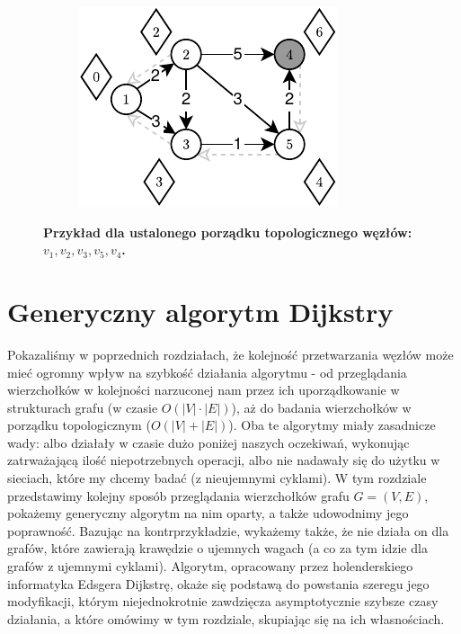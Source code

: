 \begin{figure}[!htbp]
\begin{subfigure}[b]{0.18\textwidth}
		\includegraphics[width=\textwidth]{Chapter_II/TOPOLOGIC-SHORTEST-PATH-Example/e.pdf}
		\caption{}
	\end{subfigure}
	\caption{\textbf{Przykład dla ustalonego porządku topologicznego węzłów: $v_{1}, v_{2}, v_{3}, v_{5}, v_{4}$.}} \label{fig:exampleTopologicalShotrestPath}
\end{figure}

\newpage
\section{Generyczny algorytm Dijkstry}
\label{sec:dijkstraGenericAlgorithm}

Pokazaliśmy w poprzednich rozdziałach, że kolejność przetwarzania węzłów może mieć ogromny wpływ na szybkość działania algorytmu - od przeglądania wierzchołków w kolejności narzuconej nam przez ich uporządkowanie w strukturach grafu (w czasie $ O \left( \left| V \right| \cdot \left| E \right| \right)$), aż do badania wierzchołków w porządku topologicznym ($ O \left( \left| V \right| + \left| E \right| \right)$). Oba te algorytmy miały zasadnicze wady: albo działały w czasie dużo poniżej naszych oczekiwań, wykonując zatrważającą ilość niepotrzebnych operacji, albo nie nadawały się do użytku w sieciach, które my chcemy badać (z nieujemnymi cyklami). W tym rozdziale przedstawimy kolejny sposób przeglądania wierzchołków grafu $G = \left( V, E \right)$, pokażemy generyczny algorytm na nim oparty, a także udowodnimy jego poprawność. Bazując na kontrprzykładzie, wykażemy także, że nie działa on dla grafów, które zawierają krawędzie o ujemnych wagach (a co za tym idzie dla grafów z ujemnymi cyklami). Algorytm, opracowany przez holenderskiego informatyka Edsgera Dijkstrę, okaże się podstawą do powstania szeregu jego modyfikacji, którym niejednokrotnie zawdzięcza asymptotycznie szybsze czasy działania, a które omówimy w tym rozdziale, skupiając się na ich własnościach.

